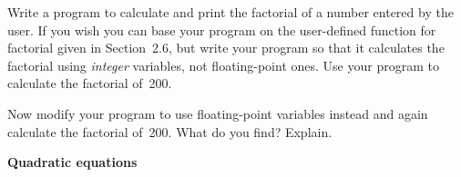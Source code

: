 \documentclass[12pt]{article}
\begin{document}
\par
\bigskip
{}\par
\noindent\hrulefill


\begin{exercises}


\exercise Write a program to calculate and print the factorial of a
number entered by the user.  If you wish you can base your program on the
user-defined function for factorial given in Section~2.6, but write your
program so that it calculates the factorial using \emph{integer}
variables, not floating-point ones.  Use your program to calculate the
factorial of~200.

Now modify your program to use floating-point variables instead and again
calculate the factorial of~200.  What do you find?  Explain.



\exercise \textbf{Quadratic equations}


\end{exercises}
\end{document}
